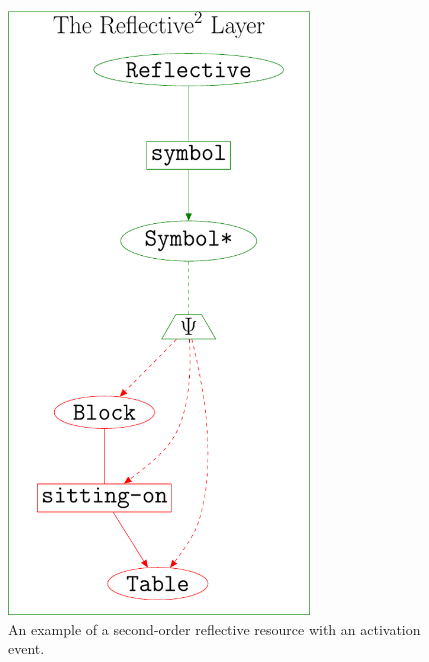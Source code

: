 \begin{figure}
\center
\includegraphics[width=8cm]{gfx/example_second_order_resource}
\caption[An example of a second-order reflective resource with an
  activation event.]{An example of a second-order reflective resource
  with an activation event.}
\label{figure:example_second_order_resource}
\end{figure}
